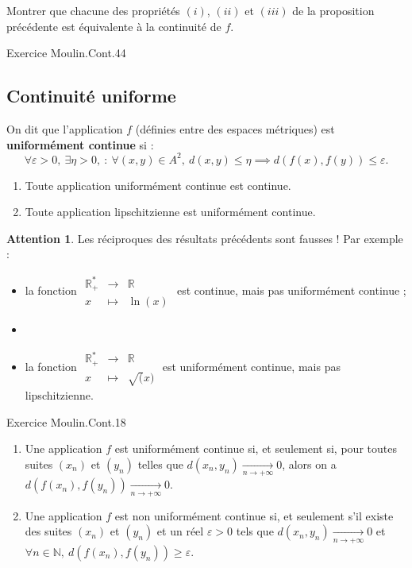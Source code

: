 \documentclass[french]{article}
\newcommand{\N}{\mathbb{N}}
\newcommand{\R}{\mathbb{R}}
\newcommand{\st}{^*}
\theoremstyle{plain}
\theoremstyle{definition}
\newtheorem*{attention}{Attention}
\theoremstyle{remark}
\begin{document}
\begin{exo}
	Montrer que chacune des propriétés $(i)$, $(ii)$ et $(iii)$ de la proposition précédente est équivalente à la continuité de $f$.
\end{exo}

Exercice Moulin.Cont.44

\subsection{Continuité uniforme}

\begin{dfn}
	On dit que l'application $f$ (définies entre des espaces métriques) est \textbf{uniformément continue} si : $$\forall\varepsilon>0,\ \exists\eta>0,\ :\ \forall (x,y)\in A^2,\ d(x,y)\leqslant\eta\implies d(f(x),f(y))\leqslant\varepsilon.$$
\end{dfn}

\begin{prop}%
	\begin{enumerate}
		\item Toute application uniformément continue est continue.
		\item Toute application lipschitzienne est uniformément continue.
	\end{enumerate}
\end{prop}

\begin{attention}
	Les réciproques des résultats précédents sont fausses ! Par exemple :
\begin{itemize}
	\item la fonction $\begin{array}{rcl}
		\R_+\st&\longrightarrow&\R\\
		x&\longmapsto&\ln(x)
	\end{array}$ est continue, mais pas uniformément continue ;
	\item \item la fonction $\begin{array}{rcl}
		\R_+\st&\longrightarrow&\R\\
		x&\longmapsto&\sqrt(x)
	\end{array}$ est uniformément continue, mais pas lipschitzienne.
\end{itemize}
\end{attention}

Exercice Moulin.Cont.18

\begin{exo}
	\begin{enumerate}
		\item Une application $f$ est uniformément continue si, et seulement si, pour toutes suites $(x_n)$ et $(y_n)$ telles que $d(x_n,y_n)\xrightarrow[n\to+\infty]{}0$, alors on a $d(f(x_n),f(y_n))\xrightarrow[n\to+\infty]{}0$.
		\item Une application $f$ est non uniformément continue si, et seulement s'il existe des suites $(x_n)$ et $(y_n)$ et un réel $\varepsilon>0$ tels que $d(x_n,y_n)\xrightarrow[n\to+\infty]{}0$ et $\forall n\in\N,\ d(f(x_n),f(y_n))\geqslant\varepsilon$.
	\end{enumerate}
\end{exo}
\end{document}
